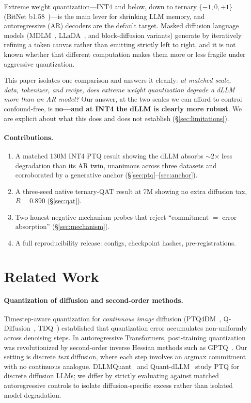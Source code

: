 \documentclass[11pt]{article}
\begin{document}
Extreme weight quantization---INT4 and below, down to ternary $\{-1, 0, +1\}$ (BitNet b1.58~\cite{bitnet})---is the main lever for shrinking LLM memory, and autoregressive (AR) decoders are the default target. Masked diffusion language models (MDLM~\cite{mdlm}, LLaDA~\cite{llada}, and block-diffusion variants) generate by iteratively refining a token canvas rather than emitting strictly left to right, and it is not known whether that different computation makes them more or less fragile under aggressive quantization.

This paper isolates one comparison and answers it cleanly: \emph{at matched scale, data, tokenizer, and recipe, does extreme weight quantization degrade a dLLM more than an AR model?} Our answer, at the two scales we can afford to control confound-free, is \textbf{no---and at INT4 the dLLM is clearly more robust}. We are explicit about what this does and does not establish (\S\ref{sec:limitations}).

\paragraph{Contributions.}
\begin{enumerate}
\item A matched 130M INT4 PTQ result showing the dLLM absorbs $\sim$2$\times$ less degradation than its AR twin, unanimous across three datasets and corroborated by a generative anchor (\S\ref{sec:ptq}--\ref{sec:anchor}).
\item A three-seed native ternary-QAT result at 7M showing no extra diffusion tax, $R = 0.890$ (\S\ref{sec:qat}).
\item Two honest negative mechanism probes that reject ``commitment $=$ error absorption'' (\S\ref{sec:mechanism}).
\item A full reproducibility release: configs, checkpoint hashes, pre-registrations.
\end{enumerate}

\section{Related Work}

\paragraph{Quantization of diffusion and second-order methods.} Timestep-aware quantization for \emph{continuous image} diffusion (PTQ4DM~\cite{ptq4dm}, Q-Diffusion~\cite{qdiffusion}, TDQ~\cite{tdq}) established that quantization error accumulates non-uniformly across denoising steps. In autoregressive Transformers, post-training quantization was revolutionized by second-order inverse Hessian methods such as GPTQ~\cite{gptq}. Our setting is discrete \emph{text} diffusion, where each step involves an argmax commitment with no continuous analogue. DLLMQuant~\cite{dllmquant} and Quant-dLLM~\cite{quantdllm} study PTQ for discrete diffusion LLMs; we differ by strictly evaluating against matched autoregressive controls to isolate diffusion-specific excess rather than isolated model degradation.
\end{document}
